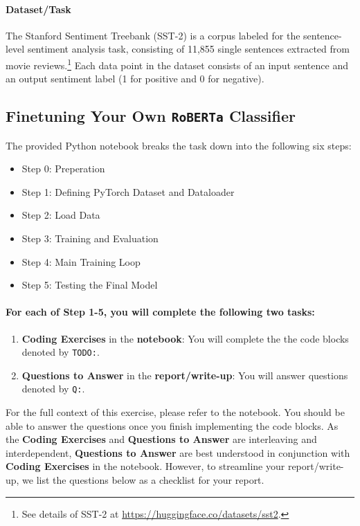 \documentclass{article}
\newcommand{\sst}{SST-2\xspace}
\begin{document}
\paragraph{Dataset/Task}
The Stanford Sentiment Treebank (\sst) is a corpus labeled for the
sentence-level sentiment analysis task, consisting of 11,855 single sentences
extracted from movie reviews.\footnote{See details of SST-2 at
\url{https://huggingface.co/datasets/sst2}.} Each data point in the dataset
consists of an input sentence and an output sentiment label (1 for positive and
0 for negative).

\subsection{Finetuning Your Own \texttt{RoBERTa} Classifier}

The provided Python notebook breaks the task down into the following six steps:

\begin{itemize}
    \item Step 0: Preperation
    \item Step 1: Defining PyTorch Dataset and Dataloader
    \item Step 2: Load Data
    \item Step 3: Training and Evaluation
    \item Step 4: Main Training Loop
    \item Step 5: Testing the Final Model
\end{itemize}

\paragraph{For each of Step 1-5, you will complete the following two tasks:}

\begin{enumerate}
    \item \textbf{Coding Exercises} in the \textbf{notebook}: You will complete
    the the code blocks denoted by \texttt{TODO:}.
    \item \textbf{Questions to Answer} in the \textbf{report/write-up}: You will
    answer questions denoted by \texttt{Q:}.
\end{enumerate}

For the full context of this exercise, please refer to the notebook. You should
be able to answer the questions once you finish implementing the code blocks. As
the \textbf{Coding Exercises} and \textbf{Questions to Answer} are interleaving
and interdependent, \textbf{Questions to Answer} are best understood in
conjunction with \textbf{Coding Exercises} in the notebook. However, to
streamline your report/write-up, we list the questions below as a checklist for
your report.
\end{document}
